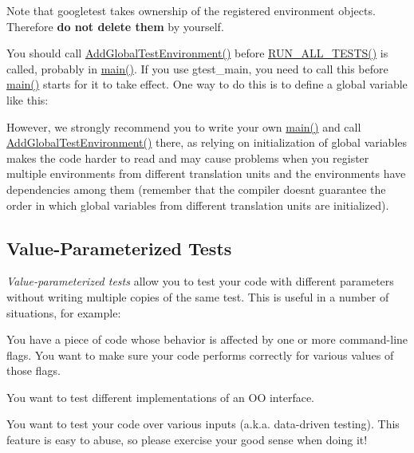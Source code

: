 Note that googletest takes ownership of the registered environment objects. Therefore {\bfseries{do not delete them}} by yourself.

You should call {\ttfamily \mbox{\hyperlink{namespacetesting_a224caeebdb6586b728d204367fea1087}{Add\+Global\+Test\+Environment()}}} before {\ttfamily \mbox{\hyperlink{googletest-master_2googletest_2include_2gtest_2gtest_8h_a853a3792807489591d3d4a2f2ff9359f}{R\+U\+N\+\_\+\+A\+L\+L\+\_\+\+T\+E\+S\+T\+S()}}} is called, probably in {\ttfamily \mbox{\hyperlink{_be_01vektoriaus_2main_8cpp_ae66f6b31b5ad750f1fe042a706a4e3d4}{main()}}}. If you use {\ttfamily gtest\+\_\+main}, you need to call this before {\ttfamily \mbox{\hyperlink{_be_01vektoriaus_2main_8cpp_ae66f6b31b5ad750f1fe042a706a4e3d4}{main()}}} starts for it to take effect. One way to do this is to define a global variable like this\+:


\begin{DoxyCode}{0}
\end{DoxyCode}


However, we strongly recommend you to write your own {\ttfamily \mbox{\hyperlink{_be_01vektoriaus_2main_8cpp_ae66f6b31b5ad750f1fe042a706a4e3d4}{main()}}} and call {\ttfamily \mbox{\hyperlink{namespacetesting_a224caeebdb6586b728d204367fea1087}{Add\+Global\+Test\+Environment()}}} there, as relying on initialization of global variables makes the code harder to read and may cause problems when you register multiple environments from different translation units and the environments have dependencies among them (remember that the compiler doesn\textquotesingle{}t guarantee the order in which global variables from different translation units are initialized).

\subsection*{Value-\/\+Parameterized Tests}

{\itshape Value-\/parameterized tests} allow you to test your code with different parameters without writing multiple copies of the same test. This is useful in a number of situations, for example\+:


\begin{DoxyItemize}
\item You have a piece of code whose behavior is affected by one or more command-\/line flags. You want to make sure your code performs correctly for various values of those flags.
\item You want to test different implementations of an OO interface.
\item You want to test your code over various inputs (a.\+k.\+a. data-\/driven testing). This feature is easy to abuse, so please exercise your good sense when doing it!
\end{DoxyItemize}

